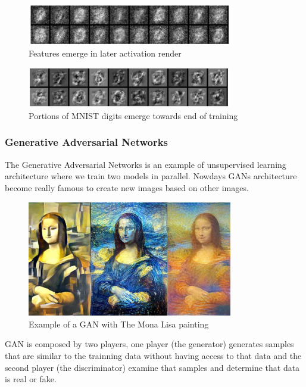 \begin{figure}[H]
\centering
\includegraphics[width=0.8\textwidth]{./figures/rbmm-2}
\caption{Features emerge in later activation render \cite{dp4j-deep-learning}}
\end{figure}

\begin{figure}[H]
\centering
\includegraphics[width=0.8\textwidth]{./figures/rbmm-3}
\caption{Portions of MNIST digits emerge towards end of training \cite{dp4j-deep-learning}}
\end{figure}

\subsubsection[Generative Adversarial Networks]{Generative Adversarial Networks}
The Generative Adversarial Networks is an example of unsupervised learning architecture where we train two models in parallel. Nowdays GANs architecture become really famous to create new images based on other images\cite{dp4j-deep-learning}. 

\begin{figure}[H]
\centering
\includegraphics[width=0.8\textwidth]{./figures/monalisa}
\caption{Example of a GAN with The Mona Lisa painting \cite{can-art}}
\end{figure}

GAN is composed by two players, one player (the generator) generates samples that are similar to the trainning data without having access to that data and the second player (the discriminator) examine that samples and determine that data is real or fake.\cite{can-art}


